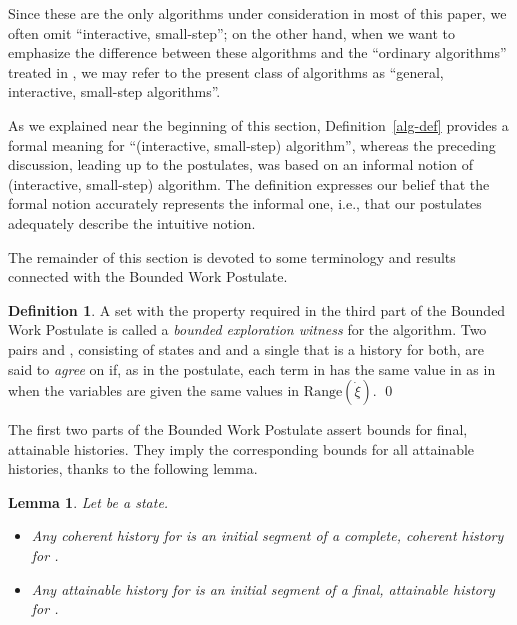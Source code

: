 \documentclass{LMCS}
\newtheorem{la}[thm]{Lemma}
\theoremstyle{definition}
\newtheorem{df}[thm]{Definition}
\newenvironment{ls}{\begin{itemize}}{\end{itemize}}
\newcommand{\ans}{\dot}
\newcommand{\ran}[1]{\ensuremath{{\text{Range}}(#1)}}
\begin{document}
Since these are the only algorithms under consideration in most of
this paper, we often omit ``interactive, small-step''; on the other
hand, when we want to emphasize the difference between these
algorithms and the ``ordinary algorithms'' treated in \cite{oa1, oa2,
  oa3}, we may refer to the present class of algorithms as ``general,
interactive, small-step algorithms''.

As we explained near the beginning of this section,
Definition~\ref{alg-def} provides a formal meaning for ``(interactive,
small-step) algorithm'', whereas the preceding discussion, leading up
to the postulates, was based on an informal notion of (interactive,
small-step) algorithm.  The definition expresses our belief that the
formal notion accurately represents the informal one, i.e., that our
postulates adequately describe the intuitive notion.  

The remainder of this section is devoted to some terminology and
results connected with the Bounded Work Postulate.

\begin{df}
  A set  with the property required in the third part of the
Bounded Work Postulate is called a \emph{bounded exploration witness}
for the algorithm.  Two pairs  and , consisting of
states  and  and a single  that is a history for both, are
said to \emph{agree} on  if, as in the postulate, each term in 
has the same value in  as in  when the variables are given the
same values in \ran{\ans\xi}.
\qed\end{df}

The first two parts of the Bounded Work Postulate assert bounds for
final, attainable histories.  They imply the corresponding bounds for
all attainable histories, thanks to the following lemma.

\begin{la}
Let  be a state.
  \begin{ls}
    \item Any coherent history for  is an initial segment of a
    complete, coherent history for .
    \item Any attainable history for  is an initial segment of a final,
    attainable history for .
  \end{ls}
\end{la}
\end{document}
